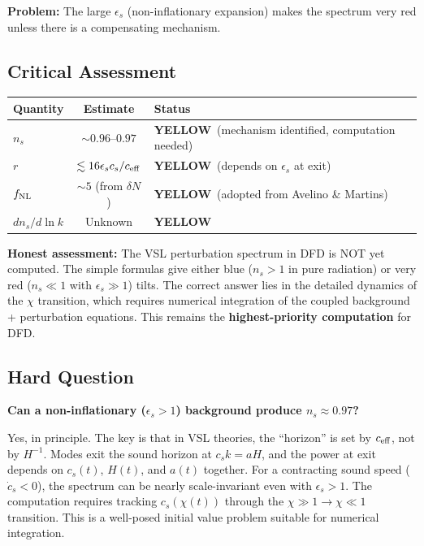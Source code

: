 \documentclass[11pt,a4paper]{article}
\newcommand{\YELLOW}{\textcolor{dfdyellow}{\textbf{YELLOW}}}
\begin{document}
\textbf{Problem:} The large $\epsilon_s$ (non-inflationary expansion) makes the spectrum very red unless there is a compensating mechanism.

\subsection{Critical Assessment}

\begin{center}
\begin{tabular}{lcl}
\toprule
\textbf{Quantity} & \textbf{Estimate} & \textbf{Status} \\
\midrule
$n_s$ & $\sim 0.96$--$0.97$ & \YELLOW\ (mechanism identified, computation needed) \\
$r$ & $\lesssim 16\epsilon_s c_s/c_{\rm eff}$ & \YELLOW\ (depends on $\epsilon_s$ at exit) \\
$f_{\rm NL}$ & $\sim 5$ (from $\delta N$) & \YELLOW\ (adopted from Avelino \& Martins) \\
$dn_s/d\ln k$ & Unknown & \YELLOW\ \\
\bottomrule
\end{tabular}
\end{center}

\textbf{Honest assessment:} The VSL perturbation spectrum in DFD is NOT yet computed. The simple formulas give either blue ($n_s > 1$ in pure radiation) or very red ($n_s \ll 1$ with $\epsilon_s \gg 1$) tilts. The correct answer lies in the detailed dynamics of the $\chi$ transition, which requires numerical integration of the coupled background + perturbation equations. This remains the \textbf{highest-priority computation} for DFD.

\subsection{Hard Question}

\textbf{Can a non-inflationary ($\epsilon_s > 1$) background produce $n_s \approx 0.97$?}

Yes, in principle. The key is that in VSL theories, the ``horizon'' is set by $c_{\rm eff}$, not by $H^{-1}$. Modes exit the sound horizon at $c_s k = aH$, and the power at exit depends on $c_s(t)$, $H(t)$, and $a(t)$ together. For a contracting sound speed ($\dot c_s < 0$), the spectrum can be nearly scale-invariant even with $\epsilon_s > 1$. The computation requires tracking $c_s(\chi(t))$ through the $\chi \gg 1 \to \chi \ll 1$ transition. This is a well-posed initial value problem suitable for numerical integration.
\end{document}
